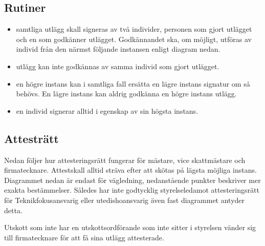 \documentclass{dsekprotokoll}
\begin{document}
\subsection{Rutiner}
\begin{itemize}
    \item samtliga utlägg skall signeras av två individer, personen som gjort utlägget och en som godkänner utlägget. Godkännandet ska, om möjligt, utföras av individ från den närmst följande instansen enligt diagram nedan.
    \item utlägg kan inte godkännas av samma individ som gjort utlägget.
    \item en högre instans kan i samtliga fall ersätta en lägre instans signatur om så behövs. En lägre instans kan aldrig godkänna en högre instans utlägg.
    \item en individ signerar alltid i egenskap av sin högsta instans.
\end{itemize}

\subsection{Attesträtt}
Nedan följer hur attesteringsrätt fungerar för mästare, vice skattmästare och firmatecknare. Attestskall alltid sträva efter att skötas på lägsta möjliga instans. Diagrammet nedan är endast för vägledning, nedanstående punkter beskriver mer exakta bestämmelser. Således har inte godtycklig styrelseledamot attesteringsrätt för Teknikfokusansvarig eller utedishoansvarig även fast diagrammet antyder detta.

Utskott som inte har en utskottsordförande som inte sitter i styrelsen vänder sig till firmatecknare för att få sina utlägg attesterade.
\end{document}

